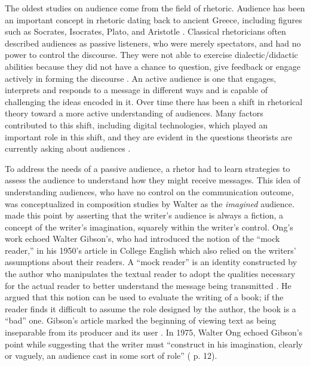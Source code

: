 The oldest studies on audience come from the field of rhetoric. Audience has been an important concept in rhetoric dating back to ancient Greece, including figures such as Socrates, Isocrates, Plato, and Aristotle \cite{breuch2018involving}. Classical rhetoricians often described audiences as passive listeners, who were merely spectators, and had no power to control the discourse. They were not able to exercise dialectic/didactic abilities because they did not have a chance to question, give feedback or engage actively in forming the discourse \cite{fish1980there}. An active audience is one that engages, interprets and responds to a message in different ways and is capable of challenging the ideas encoded in it. Over time there has been a shift in rhetorical theory toward a more active understanding of audiences. Many factors contributed to this shift, including digital technologies, which played an important role in this shift, and they are evident in the questions theorists are currently asking about audiences \cite{breuch2018involving}.

To address the needs of a passive audience, a rhetor had to learn strategies to assess the audience to understand how they might receive messages. This idea of understanding audiences, who have no control on the communication outcome, was conceptualized in composition studies by Walter \textcite{ong1975writer} as the \textit{imagined} audience. \textcite{ong1975writer} made this point by asserting that the writer’s audience is always a fiction, a concept of the writer’s imagination, squarely within the writer’s control. Ong’s work echoed Walter Gibson’s, who had introduced the notion of the “mock reader,” in his 1950’s article in College English \cite{gibson1950authors} which also relied on the writers’ assumptions about their readers. A “mock reader” is an identity constructed by the author who manipulates the textual reader to adopt the qualities necessary for the actual reader to better understand the message being transmitted \cite{gibson1950authors}. He argued that this notion can be used to evaluate the writing of a book; if the reader finds it difficult to assume the role designed by the author, the book is a “bad” one. Gibson’s article marked the beginning of viewing text as being inseparable from its producer and its user \cite{gibson1950authors}. In 1975, Walter Ong echoed Gibson’s point while suggesting that the writer must “construct in his imagination, clearly or vaguely, an audience cast in some sort of role” (\cite{ong1975writer} p. 12).

